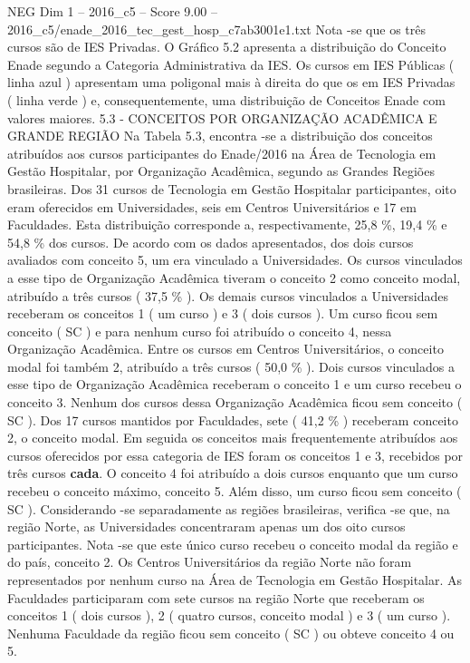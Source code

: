 \begin{textsample}{NEG Dim 1 – 2016\_c5 – Score 9.00 – 2016\_c5/enade\_2016\_tec\_gest\_hosp\_c7ab3001e1.txt}
Nota -se que os três cursos são de IES Privadas.
O Gráfico 5.2 apresenta a distribuição do Conceito Enade segundo a Categoria Administrativa da IES.
Os cursos em IES Públicas ( linha azul ) apresentam uma poligonal mais à direita do que os em IES Privadas ( linha verde ) e, consequentemente, uma distribuição de Conceitos Enade com valores maiores. 5.3 - CONCEITOS POR ORGANIZAÇÃO ACADÊMICA E GRANDE REGIÃO Na Tabela 5.3, encontra -se a distribuição dos conceitos atribuídos aos cursos participantes do Enade/2016 na Área de Tecnologia em Gestão Hospitalar, por Organização Acadêmica, segundo as Grandes Regiões brasileiras.
Dos 31 cursos de Tecnologia em Gestão Hospitalar participantes, oito eram oferecidos em Universidades, seis em Centros Universitários e 17 em Faculdades.
Esta distribuição corresponde a, respectivamente, 25,8 \%, 19,4 \% e 54,8 \% dos cursos.
De acordo com os dados apresentados, dos dois cursos avaliados com conceito 5, um era vinculado a Universidades.
Os cursos vinculados a esse tipo de Organização Acadêmica tiveram o conceito 2 como conceito modal, atribuído a três cursos ( 37,5 \% ).
Os demais cursos vinculados a Universidades receberam os conceitos 1 ( um curso ) e 3 ( dois cursos ).
Um curso ficou sem conceito ( SC ) e para nenhum curso foi atribuído o conceito 4, nessa Organização Acadêmica.
Entre os cursos em Centros Universitários, o conceito modal foi também 2, atribuído a três cursos ( 50,0 \% ).
Dois cursos vinculados a esse tipo de Organização Acadêmica receberam o conceito 1 e um curso recebeu o conceito 3.
Nenhum dos cursos dessa Organização Acadêmica ficou sem conceito ( SC ).
Dos 17 cursos mantidos por Faculdades, sete ( 41,2 \% ) receberam conceito 2, o conceito modal.
Em seguida os conceitos mais frequentemente atribuídos aos cursos oferecidos por essa categoria de IES foram os conceitos 1 e 3, recebidos por três cursos \textbf{cada}.
O conceito 4 foi atribuído a dois cursos enquanto que um curso recebeu o conceito máximo, conceito 5.
Além disso, um curso ficou sem conceito ( SC ).
Considerando -se separadamente as regiões brasileiras, verifica -se que, na região Norte, as Universidades concentraram apenas um dos oito cursos participantes.
Nota -se que este único curso recebeu o conceito modal da região e do país, conceito 2.
Os Centros Universitários da região Norte não foram representados por nenhum curso na Área de Tecnologia em Gestão Hospitalar.
As Faculdades participaram com sete cursos na região Norte que receberam os conceitos 1 ( dois cursos ), 2 ( quatro cursos, conceito modal ) e 3 ( um curso ).
Nenhuma Faculdade da região ficou sem conceito ( SC ) ou obteve conceito 4 ou 5.

\end{textsample}
